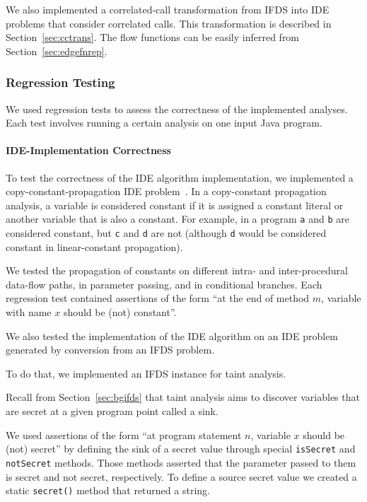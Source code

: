 We also implemented a correlated-call transformation from IFDS into IDE problems that consider correlated calls. This transformation is described in Section~\ref{sec:cctrans}. The flow functions can be easily inferred from Section~\ref{sec:edgefnrep}.

\subsubsection{Regression Testing}
We used regression tests to assess the correctness of the implemented analyses. Each test involves running a certain analysis on one input Java program.

\paragraph{IDE-Implementation Correctness}
To test the correctness of the IDE algorithm implementation, we implemented a copy-constant-propagation IDE problem~\cite{sagiv1996precise}. 
In a copy-constant propagation analysis, a variable is considered constant if it is assigned a constant literal or another variable that is also a constant. For example, in a program
\verb'a' and \verb'b' are considered constant, but \verb'c' and \verb'd' are not (although \verb'd' would be considered constant in linear-constant propagation).

We tested the propagation of constants on different intra- and inter-procedural data-flow paths, in parameter passing,
and in conditional branches. Each regression test contained assertions of the form ``at the end of method $m$, variable with name $x$ should be (not) constant''.

We also tested the implementation of the IDE algorithm on an IDE problem generated by conversion from an IFDS problem.

To do that, we implemented an IFDS instance for taint analysis.

Recall from Section~\ref{sec:bgifds} that taint analysis aims to discover variables that are secret at a given program point called a sink.

We used assertions of the form ``at program statement $n$, variable $x$ should be (not) secret'' by defining the sink of a secret value through special \verb'isSecret' and \verb'notSecret' methods.
Those methods asserted that the parameter passed to them is secret and not secret, respectively.
To define a source secret value we created a static \verb'secret()' method that returned a string. 

